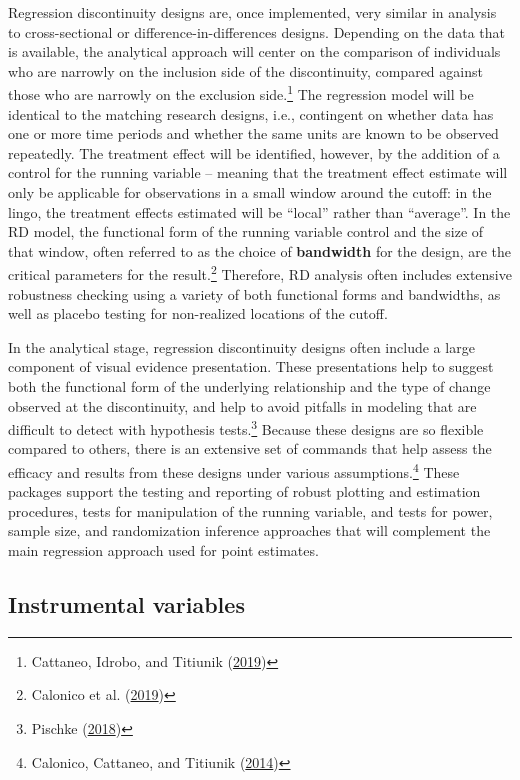 \documentclass[
]{book}
\begin{document}
Regression discontinuity designs are, once implemented,
very similar in analysis to cross-sectional or difference-in-differences designs.
Depending on the data that is available,
the analytical approach will center on the comparison of individuals
who are narrowly on the inclusion side of the discontinuity,
compared against those who are narrowly on the exclusion side.\footnote{Cattaneo, Idrobo, and Titiunik (\protect\hyperlink{ref-cattaneo2019}{2019})}
The regression model will be identical to the matching research designs,
i.e., contingent on whether data has one or more time periods
and whether the same units are known to be observed repeatedly.
The treatment effect will be identified, however, by the addition of a control
for the running variable -- meaning that the treatment effect estimate
will only be applicable for observations in a small window around the cutoff:
in the lingo, the treatment effects estimated will be ``local'' rather than ``average''.
In the RD model, the functional form of the running variable control and the size of that window,
often referred to as the choice of \textbf{bandwidth} for the design,
are the critical parameters for the result.\footnote{Calonico et al. (\protect\hyperlink{ref-calonico2019regression}{2019})}
Therefore, RD analysis often includes extensive robustness checking
using a variety of both functional forms and bandwidths,
as well as placebo testing for non-realized locations of the cutoff.

In the analytical stage, regression discontinuity designs
often include a large component of visual evidence presentation.
These presentations help to suggest both the functional form
of the underlying relationship and the type of change observed at the discontinuity,
and help to avoid pitfalls in modeling that are difficult to detect with hypothesis tests.\footnote{Pischke (\protect\hyperlink{ref-pischke2018}{2018})}
Because these designs are so flexible compared to others,
there is an extensive set of commands that help assess
the efficacy and results from these designs under various assumptions.\footnote{Calonico, Cattaneo, and Titiunik (\protect\hyperlink{ref-calonico2014robust}{2014})}
These packages support the testing and reporting
of robust plotting and estimation procedures,
tests for manipulation of the running variable,
and tests for power, sample size, and randomization inference approaches
that will complement the main regression approach used for point estimates.

\hypertarget{instrumental-variables}{%
\subsection*{Instrumental variables}\label{instrumental-variables}}
\end{document}
